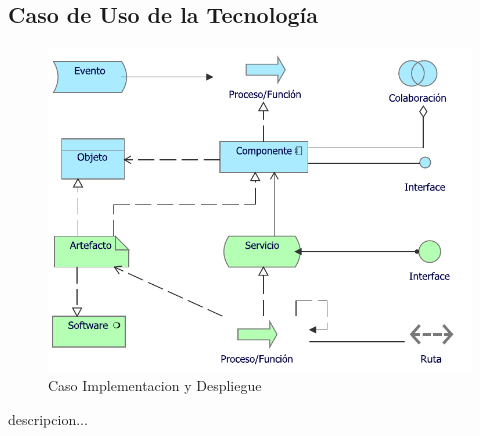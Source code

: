 
\subsection{Caso  de  Uso de la Tecnología}
\begin{figure}[h!]
	\centering
	\includegraphics[width=.7\linewidth]{imgs/caso/Implementacion}
	\caption{Caso Implementacion y Despliegue}
\end{figure}
descripcion...